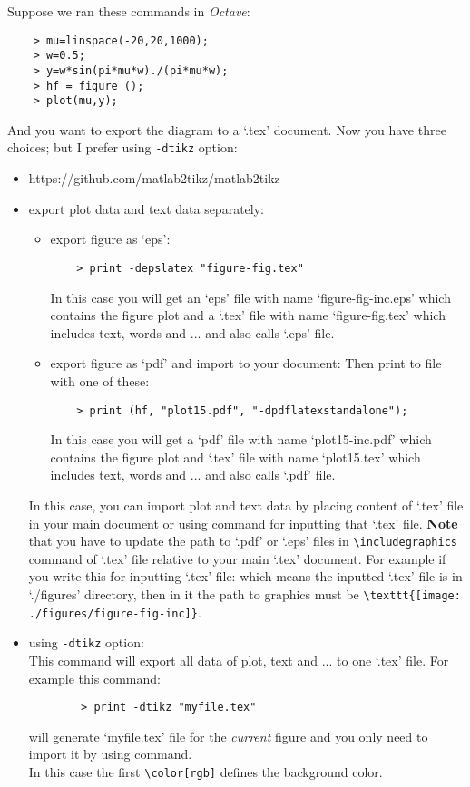 \documentclass{article}
\begin{document}
    

Suppose we ran these commands in \textit{Octave}:
\begin{Verbatim}
    > mu=linspace(-20,20,1000);
    > w=0.5;
    > y=w*sin(pi*mu*w)./(pi*mu*w);
    > hf = figure ();
    > plot(mu,y);
\end{Verbatim}
And you want to export the diagram to a `.tex' document. Now you have three
choices; but I prefer using \texttt{-dtikz} option:
\begin{itemize}
\item https://github.com/matlab2tikz/matlab2tikz
\item export plot data and text data separately:
    \begin{itemize}
    \item export figure as `eps':
    \begin{Verbatim}
    > print -depslatex "figure-fig.tex"
    \end{Verbatim}
    In this case you will get an `eps' file with name
    `figure-fig-inc.eps' which contains the figure plot and a `.tex'
    file with name `figure-fig.tex' which includes text, words and
    ... and also calls `.eps' file.
    \item export figure as `pdf' and import to your document:
    Then print to file with one of these:
    \begin{Verbatim}
    > print (hf, "plot15.pdf", "-dpdflatexstandalone");
    \end{Verbatim}
    In this case you will get a `pdf' file with name `plot15-inc.pdf'
    which contains the figure plot and `.tex' file with name
    `plot15.tex' which includes text, words and ... and also calls
    `.pdf' file.
    \end{itemize} 
    In this case, you can import plot and text data by placing content of
    `.tex' file in your main document or using \verb"" command for
    inputting that `.tex' file. \textbf{Note} that you have to update the
    path to `.pdf' or `.eps' files in \verb"\includegraphics" command of
    `.tex' file relative to your main `.tex' document. For example if you
    write this for inputting `.tex' file:
    \verb"" which means the inputted
    `.tex' file is in `./figures' directory, then in it the path to graphics
    must be \verb"\texttt{[image: ./figures/figure-fig-inc]}".
\item using \texttt{-dtikz} option:\\
    This command will export all data of plot, text and ... to one `.tex'
    file. For example this command:
    \begin{Verbatim}
        > print -dtikz "myfile.tex"
    \end{Verbatim}
    will generate `myfile.tex' file for the \textit{current} figure and you only
    need to import it by using \verb"" command.\\
    In this case the first \verb"\color[rgb]" defines the background color.
\end{itemize}
\end{document}
